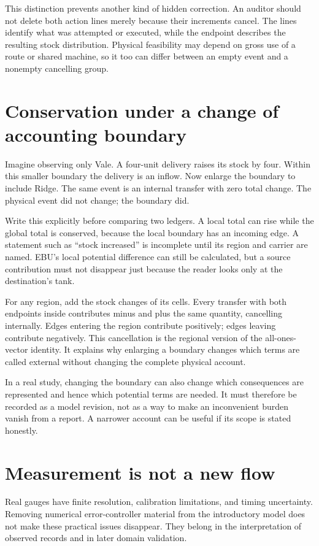 This distinction prevents another kind of hidden correction. An auditor should not delete both action lines merely because their increments cancel. The lines identify what was attempted or executed, while the endpoint describes the resulting stock distribution. Physical feasibility may depend on gross use of a route or shared machine, so it too can differ between an empty event and a nonempty cancelling group.

\section{Conservation under a change of accounting boundary}
Imagine observing only Vale. A four-unit delivery raises its stock by four. Within this smaller boundary the delivery is an inflow. Now enlarge the boundary to include Ridge. The same event is an internal transfer with zero total change. The physical event did not change; the boundary did.

Write this explicitly before comparing two ledgers. A local total can rise while the global total is conserved, because the local boundary has an incoming edge. A statement such as ``stock increased'' is incomplete until its region and carrier are named. EBU's local potential difference can still be calculated, but a source contribution must not disappear just because the reader looks only at the destination's tank.

For any region, add the stock changes of its cells. Every transfer with both endpoints inside contributes minus and plus the same quantity, cancelling internally. Edges entering the region contribute positively; edges leaving contribute negatively. This cancellation is the regional version of the all-ones-vector identity. It explains why enlarging a boundary changes which terms are called external without changing the complete physical account.

In a real study, changing the boundary can also change which consequences are represented and hence which potential terms are needed. It must therefore be recorded as a model revision, not as a way to make an inconvenient burden vanish from a report. A narrower account can be useful if its scope is stated honestly.

\section{Measurement is not a new flow}
Real gauges have finite resolution, calibration limitations, and timing uncertainty. Removing numerical error-controller material from the introductory model does not make these practical issues disappear. They belong in the interpretation of observed records and in later domain validation.

